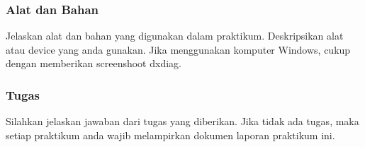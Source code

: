 \subsubsection{Alat dan Bahan}

Jelaskan alat dan bahan yang digunakan dalam praktikum. Deskripsikan alat atau
device yang anda gunakan. Jika menggunakan komputer Windows, cukup dengan
memberikan screenshoot dxdiag.
\par
\par
\subsubsection{Tugas}

Silahkan jelaskan jawaban dari tugas yang diberikan. Jika tidak ada tugas, maka
setiap praktikum anda wajib melampirkan dokumen laporan praktikum ini.
\par
\nocite{forouzan2007}




